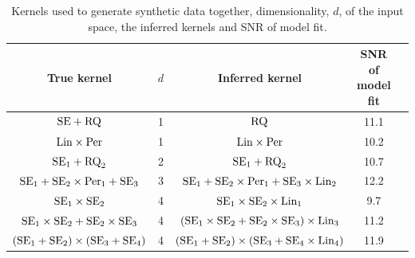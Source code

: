 \documentclass[twoside]{article}
\begin{document}
\begin{table}[ht!]
\caption{{\small
Kernels used to generate synthetic data together, dimensionality, $d$, of the input space, the inferred kernels and SNR of model fit.
}}
\label{tbl:synthetic-less}
\begin{center}
{\small
\begin{tabular}{c c | c c c}

True kernel & $d$ & Inferred kernel & SNR of model fit \\
\hline
$\textrm{SE} + \textrm{RQ}$                               & 1 & $\textrm{RQ}$ & 11.1\\
$\textrm{Lin} \times \textrm{Per}$                        & 1 & $\textrm{Lin} \times \textrm{Per}$ & 10.2\\
$\textrm{SE}_1 + \textrm{RQ}_2$                           & 2 & $\textrm{SE}_1 + \textrm{RQ}_2$ & 10.7\\
$\textrm{SE}_1 + \textrm{SE}_2 \times \textrm{Per}_1 + \textrm{SE}_3$     & 3 & $\textrm{SE}_1 + \textrm{SE}_2 \times \textrm{Per}_1 + \textrm{SE}_3 \times \textrm{Lin}_2$ & 12.2\\
$\textrm{SE}_1 \times \textrm{SE}_2$                      & 4 & $\textrm{SE}_1 \times \textrm{SE}_2 \times \textrm{Lin}_1$ & 9.7\\
$\textrm{SE}_1 \times \textrm{SE}_2 + \textrm{SE}_2 \times \textrm{SE}_3$ & 4 & $(\textrm{SE}_1 \times \textrm{SE}_2 + \textrm{SE}_2 \times \textrm{SE}_3) \times \textrm{Lin}_3$ & 11.2\\
$(\textrm{SE}_1 + \textrm{SE}_2) \times (\textrm{SE}_3 + \textrm{SE}_4)$  & 4 & $(\textrm{SE}_1 + \textrm{SE}_2) \times (\textrm{SE}_3 + \textrm{SE}_4\times\textrm{Lin}_4)$ & 11.9\\
\end{tabular}
}
\end{center}
\end{table}
\end{document}
